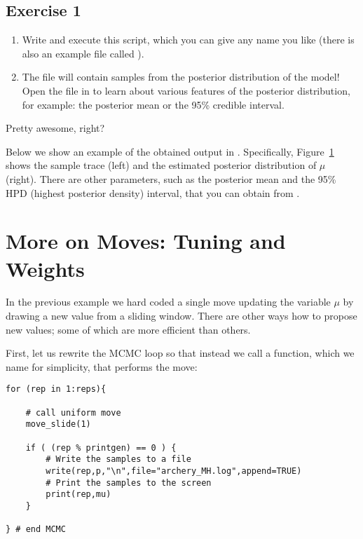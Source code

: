 \subsection{Exercise 1}

\begin{enumerate}[label=\textnormal{Step \arabic*)},leftmargin=1.5cm]
	\item Write and execute this script, which you can give any name you like (there is also an example file called ).
	\item The  file will contain samples from the posterior distribution of the model! Open the file in \Tracer to learn about various features of the posterior distribution, for example: the posterior mean or the 95\% credible interval.
\end{enumerate}
Pretty awesome, right?

Below we show an example of the obtained output in \Tracer.
Specifically, Figure~\ref{fig:mcmc_samples} shows the sample trace (left) and the estimated posterior distribution of $\mu$ (right).
There are other parameters, such as the posterior mean and the 95\% HPD (highest posterior density) interval, that you can obtain from \Tracer.
\begin{figure}[h!]
\centering
{}
\label{fig:mcmc_samples}
\end{figure}
\pagebreak


\section{More on Moves: Tuning and Weights}\label{sect:More_on_Moves}

In the previous example we hard coded a single move updating the variable $\mu$ by drawing a new value from a sliding window.
There are other ways how to propose new values; some of which are more efficient than others.

First, let us rewrite the MCMC loop so that instead we call a function, which we name  for simplicity, that performs the move:
{\tt \begin{snugshade*}
\begin{lstlisting}    
for (rep in 1:reps){
    
    # call uniform move
    move_slide(1)
    
    if ( (rep % printgen) == 0 ) {
        # Write the samples to a file
        write(rep,p,"\n",file="archery_MH.log",append=TRUE)
        # Print the samples to the screen
        print(rep,mu)
    }

} # end MCMC
\end{lstlisting}
\end{snugshade*}}

